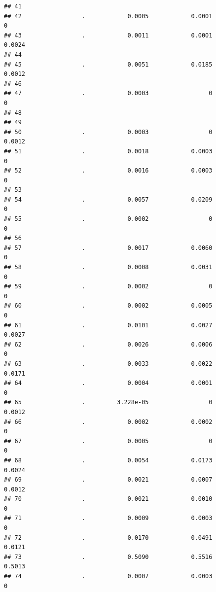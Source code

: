 \documentclass[
]{article}
\begin{document}
\begin{verbatim}
## 41                                                                        
## 42                 .            0.0005            0.0001                 0
## 43                 .            0.0011            0.0001            0.0024
## 44                                                                        
## 45                 .            0.0051            0.0185            0.0012
## 46                                                                        
## 47                 .            0.0003                 0                 0
## 48                                                                        
## 49                                                                        
## 50                 .            0.0003                 0            0.0012
## 51                 .            0.0018            0.0003                 0
## 52                 .            0.0016            0.0003                 0
## 53                                                                        
## 54                 .            0.0057            0.0209                 0
## 55                 .            0.0002                 0                 0
## 56                                                                        
## 57                 .            0.0017            0.0060                 0
## 58                 .            0.0008            0.0031                 0
## 59                 .            0.0002                 0                 0
## 60                 .            0.0002            0.0005                 0
## 61                 .            0.0101            0.0027            0.0027
## 62                 .            0.0026            0.0006                 0
## 63                 .            0.0033            0.0022            0.0171
## 64                 .            0.0004            0.0001                 0
## 65                 .         3.228e-05                 0            0.0012
## 66                 .            0.0002            0.0002                 0
## 67                 .            0.0005                 0                 0
## 68                 .            0.0054            0.0173            0.0024
## 69                 .            0.0021            0.0007            0.0012
## 70                 .            0.0021            0.0010                 0
## 71                 .            0.0009            0.0003                 0
## 72                 .            0.0170            0.0491            0.0121
## 73                 .            0.5090            0.5516            0.5013
## 74                 .            0.0007            0.0003                 0

\end{verbatim}
\end{document}
